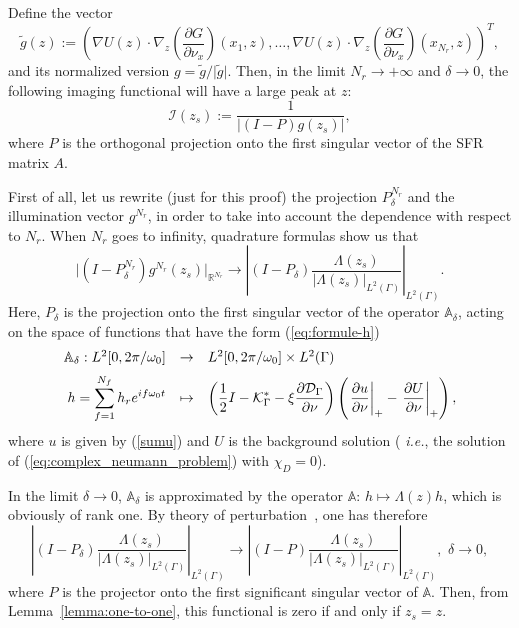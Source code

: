 \begin{proposition}

\label{proposition:SF-MUSIC} Define the vector
\begin{equation}
\tilde{g}(z):=\left(\nabla U(z)\cdot\nabla_{z}\left(\frac{\partial
G}{\partial\nu_{x}}\right)(x_{1},z),\ldots,\nabla
U(z)\cdot\nabla_{z}\left(\frac{\partial
G}{\partial\nu_{x}}\right)(x_{N_r},z)\right)^{T},\label{eq:illumination-vector-disk}
\end{equation}
and its normalized version $g=\tilde{g}/\vert\tilde{g}\vert$.
Then, in the limit $N_r\rightarrow+\infty$ and $\delta
\rightarrow0$, the following imaging functional will have a large
peak at $z$:
\begin{equation}
\mathcal{I}(z_{s}):=\frac{1}{\left|(I-P)g(z_{s})\right|},\label{eq:imaging_functional}
\end{equation}
 where $P$ is the orthogonal projection onto the first
singular vector of the SFR matrix $A$.

\end{proposition}

\proof

First of all, let us rewrite (just for this proof) the projection
$P_{\delta}^{N_r}$ and the illumination vector $g^{N_r}$, in order to
take into account the dependence with respect to $N_r$. When $N_r$
goes to infinity, quadrature formulas show us that
\[
\vert(I-P_{\delta}^{N_r})g^{N_r}(z_{s})\vert_{\mathbb{R}^{N_r}}\rightarrow\left|(I-P_{\delta})
\frac{\Lambda(z_{s})}{\vert\Lambda(z_{s})\vert_{L^{2}(\Gamma)}}\right|_{L^{2}(\Gamma)}.
\]
Here, $P_{\delta}$ is the projection onto the first singular
vector of the operator $\mathbb{A}_{\delta}$, acting on the space
of functions that have the form  (\ref{eq:formule-h})
\[\begin{array}{rll}
\mathbb{A}_{\delta}:  L^2[0, {2\pi}/{\omega_0}] &\rightarrow & L^2[0, {2\pi}/{\omega_0}] \times L^2(\Gamma) \\
\nm
\ds h = \sum_{f=1}^{N_f} h_r e^{i f \omega_0 t} &\mapsto&  \ds
\left(\frac{1}{2}I-\mathcal{K}_{\Gamma}^{*}
-\xi\frac{\partial\mathcal{D}_{\Gamma}}{\partial\nu}\right)\left(\left.\frac{\partial
u}{\partial\nu}\right|_{+}-\left.\frac{\partial
U}{\partial\nu}\right|_{+}\right),
\end{array}
\]
where $u$ is given by (\ref{sumu}) and $U$ is the background
solution (\emph{ i.e.}, the solution of
(\ref{eq:complex_neumann_problem}) with $\chi_D=0$).


In the limit $\delta \rightarrow0$, $\mathbb{A}_{\delta}$ is
approximated by the operator $\mathbb{A}:\, h\mapsto\Lambda(z)h$,
which is obviously of rank one. By theory of
perturbation~\cite{kato1976perturbation}, one has therefore
\[
\left|(I-P_{\delta})\frac{\Lambda(z_{s})}{\vert\Lambda(z_{s})\vert_{L^{2}(\Gamma)}}
\right|_{L^{2}(\Gamma)}\rightarrow\left|(I-P)\frac{\Lambda(z_{s})}{\vert\Lambda(z_{s})
\vert_{L^{2}(\Gamma)}}\right|_{L^{2}(\Gamma)},\,\,\delta\rightarrow0,
\]
where $P$ is the projector onto the first significant singular
vector of $\mathbb{A}$. Then, from Lemma~\ref{lemma:one-to-one},
this functional is zero if and only if $z_{s}=z$.

